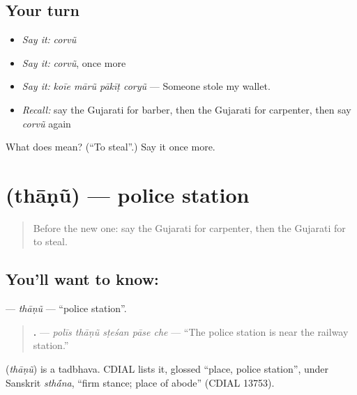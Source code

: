 \subsection*{Your turn}
\begin{itemize}
\raggedright
  \item \emph{Say it:} \emph{corvũ}
  \item \emph{Say it:} \emph{corvũ}, once more
  \item \emph{Say it:} \emph{koīe mārũ pākīṭ coryũ} — Someone stole my wallet.
  \item \emph{Recall:} say the Gujarati for barber, then the Gujarati for carpenter, then say \emph{corvũ} again
\end{itemize}

\begin{tcolorbox}[breakable,colback=teal!4,colframe=teal!35!black,title={Before you move on}]
What does  mean? (\textquotedblleft{}To steal\textquotedblright{}.) Say it once more.
\end{tcolorbox}
\section[\texorpdfstring{\gu{થાણું} (thāṇũ)}{થાણું (thāṇũ)}]{ (thāṇũ) — police station}

\label{lesson:GU-C202-thanu}



\begin{quote}
Before the new one: say the Gujarati for carpenter, then the Gujarati for to steal.
\end{quote}

\subsection*{You'll want to know: }
\textbf{} — \emph{thāṇũ} — \textquotedblleft{}police station\textquotedblright{}.

\begin{quote}
\textbf{    .} — \emph{polīs thāṇũ sṭeśan pāse che} — \textquotedblleft{}The police station is near the railway station.\textquotedblright{}
\end{quote}

\begin{cousinweb}
\textbf{} (\emph{thāṇũ}) is a tadbhava. CDIAL lists it, glossed \textquotedblleft{}place, police station\textquotedblright{}, under Sanskrit \emph{sth\'{\={a}}na}, \textquotedblleft{}firm stance; place of abode\textquotedblright{} (CDIAL 13753).
\end{cousinweb}

